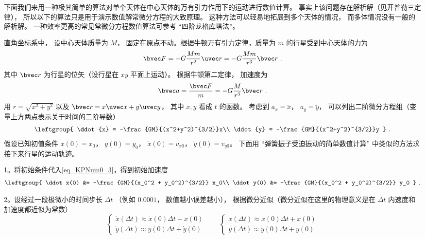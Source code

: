 

下面我们来用一种极其简单的算法对单个天体在中心天体的万有引力作用下的运动进行数值计算。 事实上该问题存在解析解（见开普勒三定律）， 所以以下的算法只是用于演示数值解常微分方程的大致原理。 这种方法可以轻易地拓展到多个天体的情况， 而多体情况没有一般的解析解。 一种效率更高的常见常微分方程数值算法可参考 “四阶龙格库塔法”。

直角坐标系中， 设中心天体质量为 $M$， 固定在原点不动。根据牛顿万有引力定律，质量为 $m$ 的行星受到中心天体的力为
\begin{equation}
\bvec F = -G \frac{Mm}{r^2}\uvec r = -G\frac{Mm}{r^3} \bvec r~.
\end{equation}
其中 $\bvec r$ 为行星的位矢（设行星在 $xy$ 平面上运动）。 根据牛顿第二定律， 加速度为
\begin{equation}
\bvec a = \frac{\bvec F}{m} = -G\frac{M}{r^3} \bvec r~.
\end{equation}
用 $r = \sqrt{x^2+y^2}$ 以及 $\bvec r = x\uvec x + y\uvec y$， 其中 $x,y$ 看成 $t$ 的函数。 考虑到 $a_x = \ddot x$， $a_y = \ddot y$， 可以列出二阶微分方程组（变量上方两点表示关于时间的二阶导数）
\begin{equation}\label{eq_KPNum0_3}
\leftgroup{
\ddot{x} = -\frac{GM}{(x^2+y^2)^{3/2}}x\\
\ddot{y} = -\frac{GM}{(x^2+y^2)^{3/2}}y
}~.\end{equation}
假设已知初值条件 $x(0) = x_0$， $y(0) = y_0$， $\dot x(0) = v_{x0}$， $\dot y(0) = v_{y0}$。 下面用 “弹簧振子受迫振动的简单数值计算” 中类似的方法求接下来行星的运动轨迹。

1。将初始条件代入\autoref{eq_KPNum0_3}，得到初始加速度
\begin{equation}
\leftgroup{
\ddot x(0) &= -\frac{GM}{(x_0^2 + y_0^2)^{3/2}} x_0\\
\ddot y(0) &= -\frac{GM}{(x_0^2 + y_0^2)^{3/2}} y_0
}~.
\end{equation}
 
2。设经过一段极微小的时间步长 $\Delta t$ （例如 $0.0001$， 数值越小误差越小）， 根据微分近似（微分近似在这里的物理意义是在 $\Delta t$ 内速度和加速度都近似为常数）
\begin{equation}
\begin{cases}
\dot x(\Delta t) \approx \ddot x(0)\Delta t + x(0)\\
\dot y(\Delta t) \approx \ddot y(0)\Delta t + \dot y(0)
\end{cases}
\qquad
\begin{cases}
x(\Delta t) \approx \dot x(0)\Delta t + x(0)\\
y(\Delta t) \approx \dot y(0)\Delta t + y(0)
\end{cases}
\end{equation}

